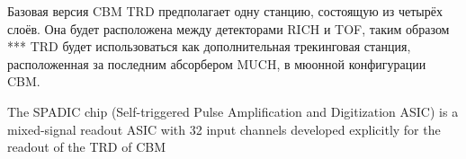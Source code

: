
Базовая версия CBM TRD предполагает одну станцию, состоящую из четырёх слоёв.
Она будет расположена между детекторами RICH и TOF, таким образом ***
TRD будет использоваться как дополнительная трекинговая станция, расположенная за последним абсорбером MUCH, в мюонной конфигурации CBM.


The SPADIC chip (Self-triggered Pulse Amplification and Digitization ASIC) is a mixed-signal readout ASIC with 32 input channels developed explicitly for the readout of the TRD of CBM

